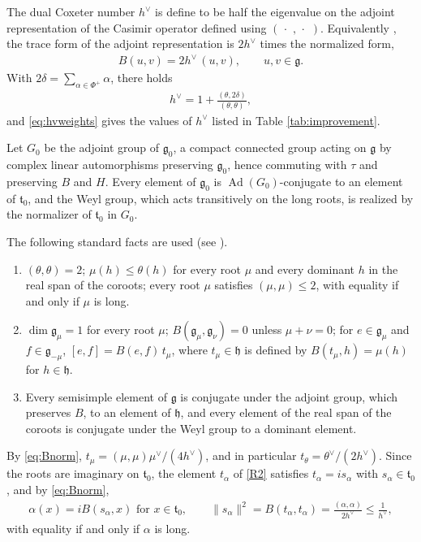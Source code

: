 \documentclass [leqno, 10pt]{amsart}
\theoremstyle{definition}
\numberwithin{equation}{section}
\newcommand{\h}{\mathfrak{h}}
\newcommand{\dum}{\,\cdot\,\,}
\newcommand{\al}{\alpha}
\newcommand{\g}{\mathfrak{g}}
\newcommand{\Ad}{\operatorname{Ad}}
\newcommand{\gz}{\g_{0}}
\newcommand{\hv}{h^\vee}
\newcommand{\norm}[1]{\lVert #1\rVert}
\begin{document}
The dual Coxeter number $\hv$ is define to be half the eigenvalue on the adjoint representation of the Casimir operator defined using $(\dum, \dum)$. Equivalently \cite[(14.30) and (14.32)]{Fuchs-Schweigert}, the trace form of the adjoint representation is $2\hv$ times the normalized form,
\begin{align}\label{eq:Bnorm}
B(u, v) = 2\hv\,(u, v), \qquad u, v \in \g.
\end{align}
With $2\delta = \sum_{\al \in \Phi^{+}}\al$, there holds \cite[Section~32.4]{Etingof-liegroups}
\begin{align}\label{eq:hvweights}
\hv = 1 + \frac{(\theta, 2\delta)}{(\theta, \theta)},
\end{align}
and \eqref{eq:hvweights} gives the values of $\hv$ listed in Table \ref{tab:improvement}.

Let $G_{0}$ be the adjoint group of $\gz$, a compact connected group acting on $\g$ by complex linear automorphisms preserving $\gz$, hence commuting with $\tau$ and preserving $B$ and $H$. Every element of $\gz$ is $\Ad(G_{0})$-conjugate to an element of $\mathfrak{t}_{0}$, and the Weyl group, which acts transitively on the long roots, is realized by the normalizer of $\mathfrak{t}_{0}$ in $G_{0}$. 

The following standard facts are used (see \cite{Humphreys}).
\begin{enumerate}[label=(R\arabic*), ref=(R\arabic*)]
\item\label{R1} $(\theta,\theta)=2$; $\mu(h)\le\theta(h)$ for every root $\mu$ and every dominant $h$ in the real span of the coroots; every root $\mu$ satisfies $(\mu,\mu)\le2$, with equality if and only if $\mu$ is long.
\item\label{R2} $\dim\g_\mu=1$ for every root $\mu$; $B(\g_\mu,\g_\nu)=0$ unless $\mu+\nu=0$; for $e\in\g_\mu$ and $f\in\g_{-\mu}$, $[e,f]=B(e,f)\,t_\mu$, where $t_{\mu} \in \h$ is defined by $B(t_\mu,h)=\mu(h)$ for $h\in\h$.
\item\label{R3} Every semisimple element of $\g$ is conjugate under the adjoint group, which preserves $B$, to an element of $\h$, and every element of the real span of the coroots is conjugate under the Weyl group to a dominant element.
\end{enumerate}
By \eqref{eq:Bnorm}, $t_{\mu} = (\mu, \mu)\mu^{\vee}/(4\hv)$, and in particular $t_{\theta} = \theta^{\vee}/(2\hv)$. Since the roots are imaginary on $\mathfrak{t}_{0}$, the element $t_{\al}$ of \ref{R2} satisfies $t_{\al} = i s_{\al}$ with $s_{\al} \in \mathfrak{t}_{0}$, and by \eqref{eq:Bnorm},
\begin{align}\label{eq:salpha}
\al(x) = iB(s_{\al}, x) \text{ for } x \in \mathfrak{t}_{0}, \qquad \norm{s_{\al}}^{2} = B(t_{\al}, t_{\al}) = \frac{(\al, \al)}{2\hv} \leq \frac{1}{\hv},
\end{align}
with equality if and only if $\al$ is long.
\end{document}
